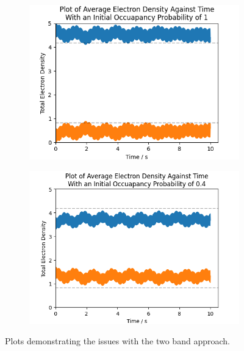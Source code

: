 \begin{figure}[htbp]
\begin{subfigure}{0.45\linewidth}
        \label{fig:two band no diagonal}
    \end{subfigure}
    \begin{subfigure}{0.45\linewidth}
        \includegraphics[width=0.9\linewidth]{Figures/Simulation/Two Small Bands Large Probability Incorrect Equilibrium.png}
        \label{fig:two band incorrect equilibrium above}
    \end{subfigure}
    \hfill
    \begin{subfigure}{0.45\linewidth}
        \includegraphics[width=0.9\linewidth]{Figures/Simulation/Two Small Bands Small Probability Incorrect Equilibrium.png}
        \label{fig:two band incorrect equilibrium below}
    \end{subfigure}
    \caption{
        Plots demonstrating the issues
        with the two band approach.
}
\end{figure}
